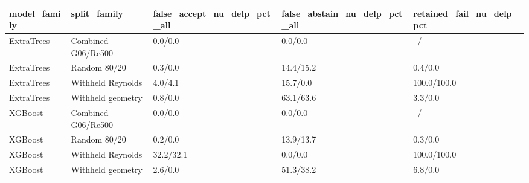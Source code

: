 \begin{tabular}{lllll}
\hline
model_family & split_family & false_accept_nu_delp_pct_all & false_abstain_nu_delp_pct_all & retained_fail_nu_delp_pct \\
\hline
ExtraTrees & Combined G06/Re500 & 0.0/0.0 & 0.0/0.0 & --/-- \\
ExtraTrees & Random 80/20 & 0.3/0.0 & 14.4/15.2 & 0.4/0.0 \\
ExtraTrees & Withheld Reynolds & 4.0/4.1 & 15.7/0.0 & 100.0/100.0 \\
ExtraTrees & Withheld geometry & 0.8/0.0 & 63.1/63.6 & 3.3/0.0 \\
XGBoost & Combined G06/Re500 & 0.0/0.0 & 0.0/0.0 & --/-- \\
XGBoost & Random 80/20 & 0.2/0.0 & 13.9/13.7 & 0.3/0.0 \\
XGBoost & Withheld Reynolds & 32.2/32.1 & 0.0/0.0 & 100.0/100.0 \\
XGBoost & Withheld geometry & 2.6/0.0 & 51.3/38.2 & 6.8/0.0 \\
\hline
\end{tabular}
